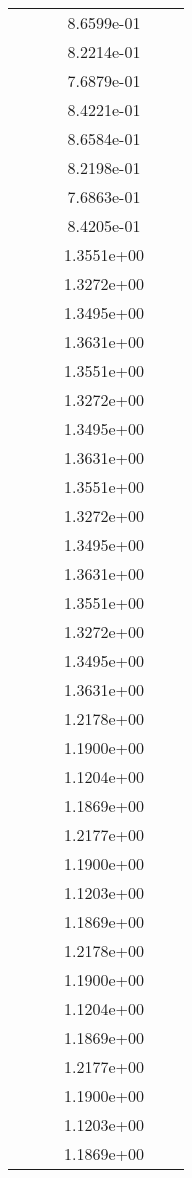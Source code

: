 \begin{xltabular}{\textwidth}{r|rS[table-format=1.3e+2]S[table-format=1.4e+2]S[table-format=1.4e+2]S[table-format=-1.5]}
&  &  & 8.6599e-01 & & \\
&  &  & 8.2214e-01 & & \\
&  &  & 7.6879e-01 & & \\
&  &  & 8.4221e-01 & & \\
&  &  & 8.6584e-01 & & \\
&  &  & 8.2198e-01 & & \\
&  &  & 7.6863e-01 & & \\
&  &  & 8.4205e-01 & & \\
&  &  & 1.3551e+00 & & \\
&  &  & 1.3272e+00 & & \\
&  &  & 1.3495e+00 & & \\
&  &  & 1.3631e+00 & & \\
&  &  & 1.3551e+00 & & \\
&  &  & 1.3272e+00 & & \\
&  &  & 1.3495e+00 & & \\
&  &  & 1.3631e+00 & & \\
&  &  & 1.3551e+00 & & \\
&  &  & 1.3272e+00 & & \\
&  &  & 1.3495e+00 & & \\
&  &  & 1.3631e+00 & & \\
&  &  & 1.3551e+00 & & \\
&  &  & 1.3272e+00 & & \\
&  &  & 1.3495e+00 & & \\
&  &  & 1.3631e+00 & & \\
&  &  & 1.2178e+00 & & \\
&  &  & 1.1900e+00 & & \\
&  &  & 1.1204e+00 & & \\
&  &  & 1.1869e+00 & & \\
&  &  & 1.2177e+00 & & \\
&  &  & 1.1900e+00 & & \\
&  &  & 1.1203e+00 & & \\
&  &  & 1.1869e+00 & & \\
&  &  & 1.2178e+00 & & \\
&  &  & 1.1900e+00 & & \\
&  &  & 1.1204e+00 & & \\
&  &  & 1.1869e+00 & & \\
&  &  & 1.2177e+00 & & \\
&  &  & 1.1900e+00 & & \\
&  &  & 1.1203e+00 & & \\
&  &  & 1.1869e+00 & & \\

\end{xltabular}
